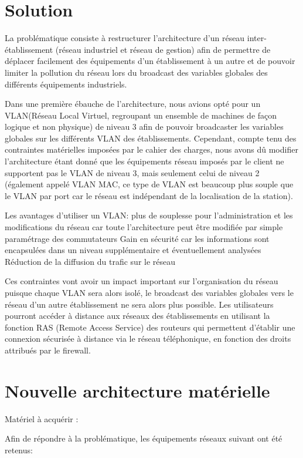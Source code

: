 \section{Solution}

La problématique consiste à restructurer l'architecture d'un réseau
inter-établissement (réseau industriel et réseau de gestion) afin de
permettre de déplacer facilement des équipements d'un établissement
à un autre et de pouvoir limiter la pollution du réseau lors du broadcast
des variables globales des différents équipements industriels.

Dans une première ébauche de l'architecture, nous avions opté pour un
VLAN(Réseau Local Virtuel, regroupant un ensemble de machines de façon
logique et non physique) de niveau 3 afin de pouvoir broadcaster les variables
globales sur les différents VLAN des établissements. Cependant, compte tenu des
contraintes matérielles imposées par le cahier des charges, nous avons dû
modifier l'architecture étant donné que les équipements réseau imposés par le
client ne supportent pas le VLAN de niveau 3, mais seulement celui de niveau 2
(également appelé VLAN MAC, ce type de VLAN est beaucoup plus souple  que le
VLAN par port car le réseau est indépendant de la localisation de la station). 


Les avantages d'utiliser un VLAN:
plus de souplesse pour l'administration et les modifications du réseau car toute
l'architecture peut être modifiée par simple paramétrage des commutateurs
Gain en sécurité car les informations sont encapsulées dans un niveau
supplémentaire et éventuellement analysées
Réduction de la diffusion du trafic sur le réseau

Ces contraintes vont avoir un impact important sur l'organisation du réseau
puisque chaque VLAN sera alors isolé, le broadcast des variables globales vers
le réseau d'un autre établissement ne sera alors plus possible. 
Les utilisateurs pourront accéder à distance aux réseaux des établissements en
utilisant la fonction RAS (Remote Access Service) des routeurs qui permettent
d'établir une connexion sécurisée à  distance via le réseau téléphonique, en
fonction des droits attribués par le firewall. 

 \section{Nouvelle architecture matérielle}

Matériel à acquérir :

Afin de répondre à la problématique, les équipements réseaux suivant
ont été retenus:

